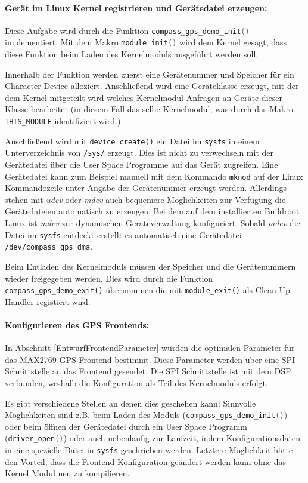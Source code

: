 \paragraph{Gerät im Linux Kernel registrieren und Gerätedatei erzeugen:} Diese Aufgabe wird durch die Funktion \lstinline[language=C]$compass_gps_demo_init()$ implementiert. Mit dem Makro \lstinline[language=C]$module_init()$ wird dem Kernel gesagt, dass diese Funktion beim Laden des Kernelmoduls ausgeführt werden soll. 

Innerhalb der Funktion werden zuerst eine Gerätenummer und Speicher für ein Character Device alloziert. Anschließend wird eine Geräteklasse erzeugt, mit der dem Kernel mitgeteilt wird welches Kernelmodul Anfragen an Geräte dieser Klasse bearbeitet (in diesem Fall das selbe Kernelmodul, was durch das Makro \lstinline[language=C]$THIS_MODULE$ identifiziert wird.)

Anschließend wird mit \lstinline$device_create()$ ein Datei im \lstinline$sysfs$ in einem Unterverzeichnis von \lstinline$/sys/$ erzeugt. Dies ist nicht zu verwechseln mit der Gerätedatei über die User Space Programme auf das Gerät zugreifen. Eine Gerätedatei kann zum Beispiel manuell mit dem Kommando \lstinline$mknod$ auf der Linux Kommandozeile unter Angabe der Gerätenummer erzeugt werden. Allerdings stehen mit \emph{udev} oder \emph{mdev} auch bequemere Möglichkeiten zur Verfügung die Gerätedateien automatisch zu erzeugen. Bei dem auf dem \comboard installierten Buildroot Linux ist \emph{mdev} zur dynamischen Geräteverwaltung konfiguriert. Sobald \emph{mdev} die Datei im \lstinline$sysfs$ entdeckt erstellt es automatisch eine Gerätedatei \lstinline$/dev/compass_gps_dma$.

Beim Entladen des Kernelmoduls müssen der Speicher und die Gerätenummern wieder freigegeben werden. Dies wird durch die Funktion \lstinline$compass_gps_demo_exit()$ übernommen die mit \lstinline$module_exit()$ als Clean-Up Handler registiert wird.

\paragraph{Konfigurieren des GPS Frontends:}
In Abschnitt \ref{EntwurfFrontendParameter} wurden die optimalen Parameter für das MAX2769 GPS Frontend bestimmt. Diese Parameter werden über eine SPI Schnittstelle an das Frontend gesendet. Die SPI Schnittstelle ist mit dem DSP verbunden, weshalb die Konfiguration als Teil des Kernelmoduls erfolgt.

Es gibt verschiedene Stellen an denen dies geschehen kann: Sinnvolle Möglichkeiten sind z.B. beim Laden des Moduls (\lstinline[language=C]$compass_gps_demo_init()$) oder beim öffnen der Gerätedatei durch ein User Space Programm (\lstinline[language=C]$driver_open()$) oder auch nebenläufig zur Laufzeit, indem Konfigurationsdaten in eine spezielle Datei in \lstinline$sysfs$ geschrieben werden. Letztere Möglichkeit hätte den Vorteil, dass die Frontend Konfiguration geändert werden kann ohne das Kernel Modul neu zu kompilieren.

